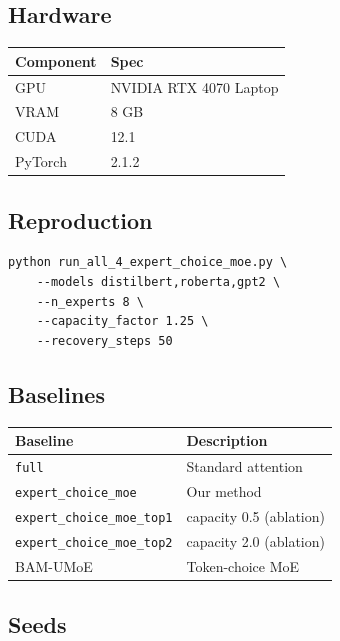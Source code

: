 \subsection{Hardware}

\begin{table}[H]
\centering
\small
\begin{tabular}{ll}
\toprule
\textbf{Component} & \textbf{Spec} \\
\midrule
GPU & NVIDIA RTX 4070 Laptop \\
VRAM & 8 GB \\
CUDA & 12.1 \\
PyTorch & 2.1.2 \\
\bottomrule
\end{tabular}
\end{table}

\subsection{Reproduction}

\begin{lstlisting}
python run_all_4_expert_choice_moe.py \
    --models distilbert,roberta,gpt2 \
    --n_experts 8 \
    --capacity_factor 1.25 \
    --recovery_steps 50
\end{lstlisting}

\subsection{Baselines}

\begin{table}[H]
\centering
\small
\begin{tabular}{ll}
\toprule
\textbf{Baseline} & \textbf{Description} \\
\midrule
\texttt{full} & Standard attention \\
\texttt{expert\_choice\_moe} & Our method \\
\texttt{expert\_choice\_moe\_top1} & capacity 0.5 (ablation) \\
\texttt{expert\_choice\_moe\_top2} & capacity 2.0 (ablation) \\
BAM-UMoE & Token-choice MoE \\
\bottomrule
\end{tabular}
\end{table}

\subsection{Seeds}

